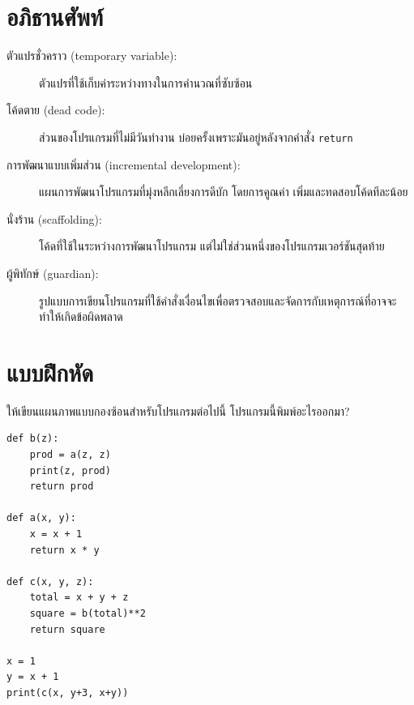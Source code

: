 \section{อภิธานศัพท์} %

\begin{description}

\item[ตัวแปรชั่วคราว (temporary variable):]  ตัวแปรที่ใช้เก็บค่าระหว่างทางในการคำนวณที่ซับซ้อน

\item[โค้ดตาย (dead code):] ส่วนของโปรแกรมที่ไม่มีวันทำงาน บ่อยครั้งเพราะมันอยู่หลังจากคำสั่ง {\tt return}

\item[การพัฒนาแบบเพิ่มส่วน (incremental development):]  แผนการพัฒนาโปรแกรมที่มุ่งหลีกเลี่ยงการดีบัก โดยการคูณค่า
เพิ่มและทดสอบโค้ดทีละน้อย 

\item[นั่งร้าน (scaffolding):]  โค้ดที่ใช้ในระหว่างการพัฒนาโปรแกรม แต่ไม่ใช่ส่วนหนึ่งของโปรแกรมเวอร์ชันสุดท้าย

\item[ผู้พิทักษ์ (guardian):]  รูปแบบการเขียนโปรแกรมที่ใช้คำสั่งเงื่อนไขเพื่อตรวจสอบและจัดการกับเหตุการณ์ที่อาจจะทำให้เกิดข้อผิดพลาด

\end{description}


\section{แบบฝึกหัด}

\begin{exercise}

ให้เขียนแผนภาพแบบกองซ้อนสำหรับโปรแกรมต่อไปนี้ โปรแกรมนี้พิมพ์อะไรออกมา?

\begin{verbatim}
def b(z):
    prod = a(z, z)
    print(z, prod)
    return prod

def a(x, y):
    x = x + 1
    return x * y

def c(x, y, z):
    total = x + y + z
    square = b(total)**2
    return square

x = 1
y = x + 1
print(c(x, y+3, x+y))
\end{verbatim}

\end{exercise}


